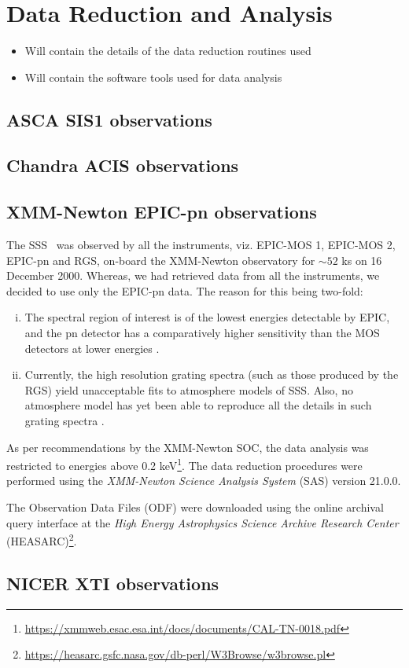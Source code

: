 \section{Data Reduction and Analysis} \label{sec:reduction-analysis}
    \begin{itemize}
        \item Will contain the details of the data reduction routines used
        \item Will contain the software tools used for data analysis
    \end{itemize}
    
    \subsection{ASCA SIS1 observations}
    
    \subsection{Chandra ACIS observations}
    
    \subsection{XMM-Newton EPIC-pn observations}
    	The SSS \source\ was observed by all the instruments, viz. EPIC-MOS 1, EPIC-MOS 2, EPIC-pn and RGS, on-board the XMM-Newton observatory for $\sim 52$ ks on 16 December 2000. Whereas, we had retrieved data from all the instruments, we decided to use only the EPIC-pn data. The reason for this being two-fold:
    	\begin{enumerate}[i.]
    		\item The spectral region of interest is of the lowest energies detectable by EPIC, and the pn detector has a comparatively higher sensitivity than the MOS detectors at lower energies \cite{stecchini2023revisiting,mateos2009statistical}.
    		\item Currently, the high resolution grating spectra (such as those produced by the RGS) yield unacceptable fits to atmosphere models of SSS. Also, no atmosphere model has yet been able to reproduce all the details in such grating spectra \cite{ness2020complications}.
    	\end{enumerate}
    As per recommendations by the XMM-Newton SOC, the data analysis was restricted to energies above 0.2 keV\footnote{\url{https://xmmweb.esac.esa.int/docs/documents/CAL-TN-0018.pdf}}. The data reduction procedures were performed using the \textit{XMM-Newton Science Analysis System} (SAS) version 21.0.0.
    
    The Observation Data Files (ODF) were downloaded using the online archival query interface at the \textit{High Energy Astrophysics Science Archive Research Center} (HEASARC)\footnote{\url{https://heasarc.gsfc.nasa.gov/db-perl/W3Browse/w3browse.pl}}.
    \subsection{NICER XTI observations}
    
